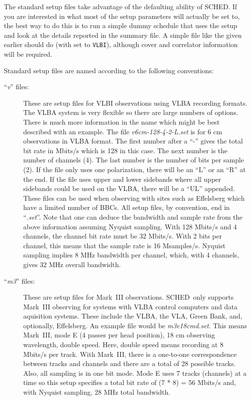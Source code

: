 \documentclass{report}
\newcommand{\sched}{{\sc SCHED}}
\newcommand{\schedb}{{\sc SCHED~}}
\begin{document}
The standard setup files take advantage of the defaulting ability of
\sched.  If you are interested in what most of the setup parameters
will actually be set to, the best way to do this is to run a simple
dummy schedule that uses the setup and look at the details reported in
the summary file.  A simple file like the  given earlier should do (with  set to {\tt VLBI}), although cover and correlator
information will be required.

Standard setup files are named according to the following
conventions:

\begin{description}

\item[``{\sl v}'' files:] These are setup files for VLBI observations
using VLBA recording formats.  The VLBA system is very flexible so
there are large numbers of options.  There is much more information in
the name which might be best described with an example.  The file {\sl
v6cm-128-4-2-L.set} is for 6 cm observations in VLBA format.  The
first number after a ``-'' gives the total bit rate in Mbits/s which
is 128 in this case.  The next number is the number of channels (4).
The last number is the number of bits per sample (2).  If the file
only uses one polarization, there will be an ``L'' or an ``R'' at the
end.  If the file uses upper and lower sidebands where all upper
sidebands could be used on the VLBA, there will be a ``UL'' appended.
These files can be used when observing with sites such as Effelsberg
which have a limited number of BBCs.  All setup files, by convention,
end in ``{\sl .set}''.  Note that one can deduce the bandwidth and
sample rate from the above information assuming Nyquist sampling.
With 128 Mbits/s and 4 channels, the channel bit rate must be 32
Mbits/s.  With 2 bits per channel, this means that the sample rate is
16 Msamples/s.  Nyquist sampling implies 8 MHz bandwidth per channel,
which, with 4 channels, gives 32 MHz overall bandwidth.

\item[``{\sl m3}'' files:] These are setup files for Mark~III
observations.  \schedb only supports Mark~III observing for
systems with VLBA control computers and data aquisition systems.
These include the VLBA, the VLA, Green Bank, and, optionally,
Effelsberg.  An example file would be {\sl m3e18cmd.set}.  This means
Mark~III, mode E (4 passes per head position), 18 cm observing
wavelength, double speed.  Here, double speed means recording at 8
Mbits/s per track.  With Mark~III, there is a one-to-one
correspondence between tracks and channels and there are a total of 28
possible tracks.  Also, all sampling is in one bit mode.  Mode E uses
7 tracks (channels) at a time so this setup specifies a total bit rate
of (7 * 8) = 56 Mbits/s and, with Nyquist sampling, 28
MHz total bandwidth.


\end{description}
\end{document}
